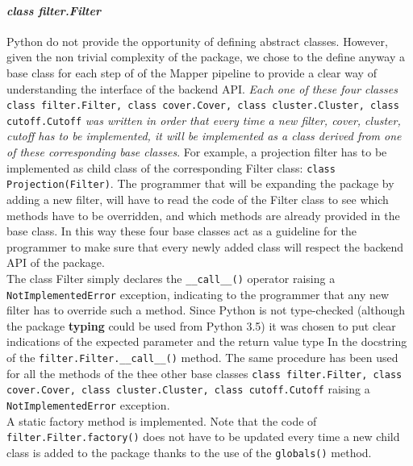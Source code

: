 \paragraph{\textit{class filter.Filter}} \label{subsubsection:class filter.Filter}
Python do not provide the opportunity of defining abstract classes. However, given the non trivial complexity of the package, we chose to the define anyway a base class for each step of of the Mapper pipeline to provide a clear way of understanding the interface of the backend API. \textit{Each one of these four classes} \lstinline{class filter.Filter, class cover.Cover, class cluster.Cluster, class cutoff.Cutoff} \textit{was written in order that every time a new filter, cover, cluster, cutoff has to be implemented, it will be implemented as a class derived from one of these corresponding base classes}. For example, a projection filter has to be implemented as child class of the corresponding Filter class: \lstinline|class Projection(Filter)|. The programmer that will be expanding the package by adding a new filter, will have to read the code of the Filter class to see which methods have to be overridden, and which methods are already provided in the base class. In this way these four base classes act as a guideline for the programmer to make sure that every newly added class will respect the backend API of the package.\\The class Filter simply declares the \lstinline{__call__()} operator raising a \lstinline{NotImplementedError} exception, indicating to the programmer that any new filter has to override such a method. Since Python is not type-checked (although the package \textbf{typing} could be used from Python 3.5) it was chosen to put clear indications of the expected parameter and the return value type In the docstring of the \lstinline{filter.Filter.__call__()} method. The same procedure has been used for all the methods of the thee other base classes \lstinline{class filter.Filter, class cover.Cover, class cluster.Cluster, class cutoff.Cutoff} raising a \lstinline{NotImplementedError} exception.\\ A static factory method is implemented. Note that the code of \lstinline{filter.Filter.factory()} does not have to be updated every time a new child class is added to the package thanks to the use of the \lstinline{globals()} method.
